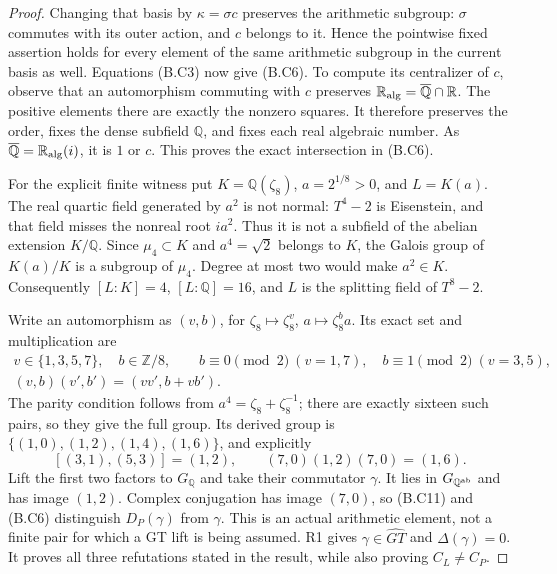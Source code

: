\begin{proof}
Changing that basis by $\kappa=\sigma c$ preserves the
arithmetic subgroup: $\sigma$ commutes with its outer action,
and $c$ belongs to it.  Hence the pointwise fixed assertion
holds for every element of the same arithmetic subgroup in
the current basis as well.  Equations (B.C3) now give (B.C6).
To compute its centralizer of $c$, observe that an
automorphism commuting with $c$ preserves
$\mathbb R_{\rm alg}=\overline{\mathbb Q}\cap\mathbb R$.
The positive elements there are exactly the nonzero squares.
It therefore preserves the order, fixes the dense subfield
$\mathbb Q$, and fixes each real algebraic number.  As
$\overline{\mathbb Q}=\mathbb R_{\rm alg}(i)$, it is $1$
or $c$.  This proves the exact intersection in (B.C6).

For the explicit finite witness put
$K=\mathbb Q(\zeta_8)$, $a=2^{1/8}>0$, and $L=K(a)$.
The real quartic field generated by $a^2$ is not normal:
$T^4-2$ is Eisenstein, and that field misses the nonreal root
$ia^2$.  Thus it is not a subfield of the abelian extension
$K/\mathbb Q$.  Since $\mu_4\subset K$ and $a^4=\sqrt2$
belongs to $K$, the Galois group of $K(a)/K$ is a subgroup
of $\mu_4$.  Degree at most two would make $a^2\in K$.
Consequently $[L:K]=4$, $[L:\mathbb Q]=16$, and $L$ is the
splitting field of $T^8-2$.

Write an automorphism as $(v,b)$, for
$\zeta_8\mapsto\zeta_8^v$, $a\mapsto\zeta_8^ba$.
Its exact set and multiplication are
\[
\begin{gathered}
 v\in\{1,3,5,7\},\quad b\in\mathbb Z/8,\qquad
 b\equiv0\pmod2\ (v=1,7),\quad
 b\equiv1\pmod2\ (v=3,5),\\
       (v,b)(v',b')=(vv',b+vb').
\end{gathered}                                             \tag{B.C10}
\]
The parity condition follows from
$a^4=\zeta_8+\zeta_8^{-1}$; there are exactly sixteen such
pairs, so they give the full group.  Its derived group is
$\{(1,0),(1,2),(1,4),(1,6)\}$, and explicitly
\[
 [(3,1),(5,3)]=(1,2),\qquad
 (7,0)(1,2)(7,0)=(1,6).
 \tag{B.C11}
\]
Lift the first two factors to $G_{\mathbb Q}$ and take their
commutator $\gamma$.  It lies in
$G_{\mathbb Q^{\rm ab}}$ and has image $(1,2)$.
Complex conjugation has image $(7,0)$, so (B.C11) and (B.C6)
distinguish $D_P(\gamma)$ from $\gamma$.  This is an actual
arithmetic element, not a finite pair for which a GT lift is
being assumed.  R1 gives
$\gamma\in\widehat{GT}$ and $\Delta(\gamma)=0$.
It proves all three refutations stated in the result, while
also proving $C_L\ne C_P$.
\end{proof}

